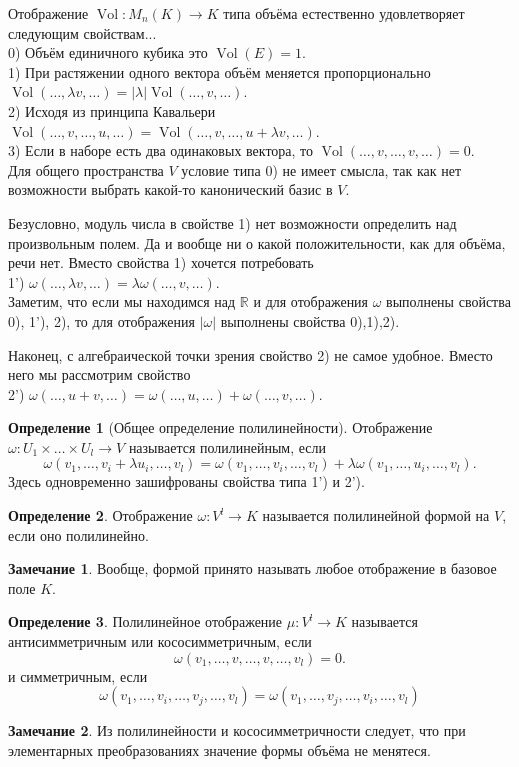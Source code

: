 \documentclass[10pt,a4paper,oneside]{book}
\theoremstyle{definition}
\newtheorem*{rem}{\color{green!50!blue}Замечание}
\newtheorem*{defn}{\color{yellow!30!red} Определение}
\newcommand{\mb}[1]{\mathbb{#1}}
\newcommand{\Vol}{\operatorname{Vol}}
\def\dfn{\begin{defn}}
\def\edfn{\end{defn}}
\def\rm{\begin{rem}}
\def\erm{\end{rem}}
\begin{document}
Отображение $\Vol \colon M_n(K) \to K$ типа объёма естественно удовлетворяет следующим свойствам...\\
0) Объём единичного кубика это $\Vol(E)=1$.\\
1) При растяжении одного вектора объём меняется пропорционально $\Vol(\dots,\lambda v,\dots)=|\lambda|\Vol(\dots,v,\dots)$.\\
2) Исходя из принципа Кавальери $\Vol(\dots,v,\dots,u,\dots)=\Vol(\dots,v,\dots,u+\lambda v,\dots)$.\\
3) Если в наборе есть два одинаковых вектора, то $\Vol(\dots,v, \dots, v,\dots)=0$.\\
Для общего пространства $V$ условие типа 0) не имеет смысла, так как нет возможности выбрать какой-то канонический базис в $V$.

Безусловно, модуль числа в свойстве 1) нет возможности определить над произвольным полем. Да и вообще ни о какой положительности, как для объёма, речи нет. Вместо свойства 1) хочется потребовать\\
1') $\omega(\dots,\lambda v,\dots)=\lambda \omega(\dots,v,\dots)$.\\
Заметим, что если мы находимся над $\mb R$ и  для отображения $\omega$ выполнены свойства 0), 1'), 2), то для отображения $|\omega|$ выполнены свойства 0),1),2). 

Наконец, с алгебраической точки зрения свойство 2) не самое удобное. Вместо него мы рассмотрим свойство\\
2') $\omega(\dots,u+v,\dots)=\omega(\dots,u,\dots)+\omega(\dots,v,\dots)$.


\dfn[Общее определение полилинейности] Отображение $\omega \colon  U_1\times \dots \times U_l\to V $ называется полилинейным, если 
$$\omega(v_1,\dots,v_i+\lambda u_i,\dots, v_l)= \omega(v_1,\dots,v_i,\dots, v_l)+\lambda\omega(v_1,\dots,u_i,\dots, v_l).$$
Здесь одновременно зашифрованы свойства типа 1')  и  2').
\edfn




\dfn
Отображение $\omega \colon  V^l\to K $ называется полилинейной формой на $V$, если оно полилинейно.
\edfn

\rm Вообще, формой принято называть любое отображение в базовое поле $K$.
\erm


\begin{defn}
Полилинейное отображение $\mu \colon V^l\to K $ называется антисимметричным или кососимметричным, если
$$\omega(v_1,\dots,v,\dots,v,\dots, v_l)=0.$$ и симметричным, если
$$\omega(v_1,\dots,v_i,\dots,v_j,\dots, v_l)=\omega(v_1,\dots,v_j,\dots,v_i,\dots, v_l)$$
\end{defn}

\rm Из полилинейности и кососимметричности следует, что при элементарных преобразованиях значение формы объёма не менятеся.
\erm






\end{document}
